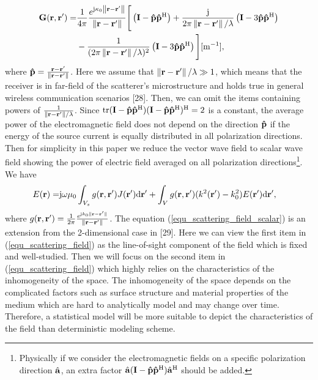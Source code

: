 \documentclass[a4paper,12pt]{article}
\begin{document}
\begin{framed}
{\begin{equation}
	\begin{aligned}
		{\bf{G}}({\bf{r}},{\bf{r}'}) =& \frac{1}{{4\pi }}\frac{{{e^{{\rm{j}}\kappa_0 \left\| {{\bf{r}} - {\bf{r}'}} \right\|}}}}{{\left\| {{\bf{r}} - {\bf{r}'}} \right\|}}\Bigg[\left( {{\bf{I}} - {\bf{\hat p}}{{{\bf{\hat p}}}^{\rm{H}}}} \right) + \frac{{\rm j}}{2\pi \left\| {{\bf{r}} - {\bf{r}'}} \right\| /\lambda}\left( {\bf I}-3{\bf{\hat p}}{{{\bf{\hat p}}}^{\rm{H}}} \right) \\&-\frac{1}{(2\pi\left\| {{\bf{r}} - {\bf{r}'}} \right\|/\lambda )^2 }\left( {\bf I}-3{\bf{\hat p}}{{{\bf{\hat p}}}^{\rm{H}}}  \right) \Bigg] [{\rm m}^{-1}],
		\label{Green}
	\end{aligned}
\end{equation}
where ${\bf{\hat p}} = \frac{{\bf{r}} - {\bf{r}'}}{{\left\| {\bf{r}} - {\bf{r}'} \right\|}}$.
Here we assume that $\left\| {{\bf{r}} - {\bf{r}'}} \right\|/\lambda \gg 1$, which means that the receiver is in far-field of the scatterer's microstructure and holds true in general wireless communication scenarios [28]. Then, we can omit the items containing powers of $\frac{1}{\left\| {{\bf{r}} - {\bf{r}'}} \right\|/\lambda}$. Since ${\rm tr}({\bf I}-{\bf{\hat p}}{{{\bf{\hat p}}}^{\rm{H}}})({\bf I}-{\bf{\hat p}}{{{\bf{\hat p}}}^{\rm{H}}})^{\rm H} = 2$ is a constant, the average power of the electromagnetic field does not depend on the direction ${\bf{\hat p}}$ if the energy of the source current is equally distributed in all polarization directions. Then for simplicity in this paper we reduce the vector wave field to scalar wave field showing the power of electric field averaged on all polarization directions\footnote{\color{red}Physically if we consider the electromagnetic fields on a specific polarization direction $\hat{\bf a}$, an extra factor $\hat{\bf a}({\bf{I}} - {\bf{\hat p}}{{{\bf{\hat p}}}^{\rm{H}}})\hat{\bf a}^{\rm H}$ should be added.}. We have
\begin{equation}
	\begin{aligned} 
		E({\bf r}) =& {\rm j}\omega\mu_0\int_{V_s} g({\bf r},{\bf r}')J({\bf r}'){\rm d}{\bf r}' + \int_{V} g({\bf r},{\bf r}')(k^2({\bf r}')-k_0^2) 
		E({\bf r}'){\rm d}{\bf r}',
	\end{aligned}
	\label{equ_scattering_field_scalar}
\end{equation}		
where $g({\bf r},{\bf r}') = \frac{1}{2\pi}\frac{e^{{\rm j}k_0\| {\bf r}-{\bf r}' \|}}{\|{\bf r}-{\bf r}' \|}$.
}
The equation (\ref{equ_scattering_field_scalar}) is an extension from the 2-dimensional case in [29]. Here we can view the first item in (\ref{equ_scattering_field}) as the line-of-sight component of the field which is fixed and well-studied. Then we will focus on the second item in (\ref{equ_scattering_field}) which highly relies on the characteristics of the inhomogeneity of the space. The inhomogeneity of the space depends on the complicated factors such as surface structure and material properties of the medium which are hard to analytically model and may change over time. Therefore, a statistical model will be more suitable to depict the characteristics of the field than deterministic modeling scheme. 
\end{framed}
\end{document}
